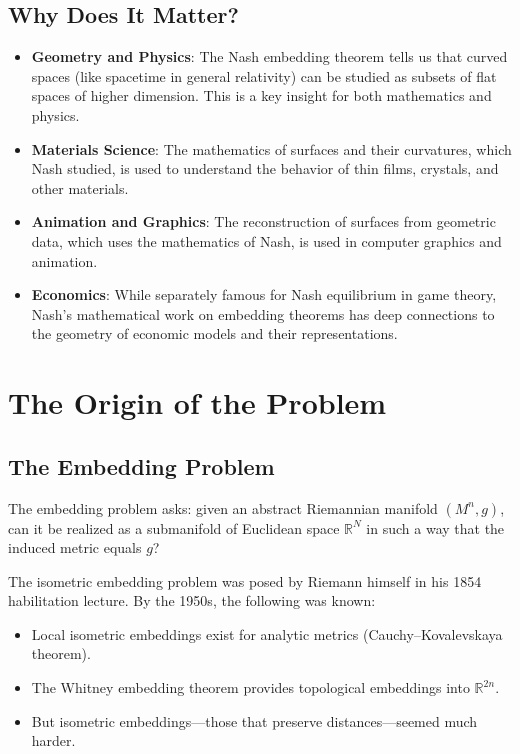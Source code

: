 \subsection{Why Does It Matter?}

\begin{itemize}
\item \textbf{Geometry and Physics}: The Nash embedding theorem tells us that curved spaces (like spacetime in general relativity) can be studied as subsets of flat spaces of higher dimension. This is a key insight for both mathematics and physics.

\item \textbf{Materials Science}: The mathematics of surfaces and their curvatures, which Nash studied, is used to understand the behavior of thin films, crystals, and other materials.

\item \textbf{Animation and Graphics}: The reconstruction of surfaces from geometric data, which uses the mathematics of Nash, is used in computer graphics and animation.

\item \textbf{Economics}: While separately famous for Nash equilibrium in game theory, Nash's mathematical work on embedding theorems has deep connections to the geometry of economic models and their representations.
\end{itemize}

\section{The Origin of the Problem}

\subsection{The Embedding Problem}

The embedding problem asks: given an abstract Riemannian manifold $(M^n, g)$, can it be realized as a submanifold of Euclidean space $\mathbb{R}^N$ in such a way that the induced metric equals $g$?

The isometric embedding problem was posed by Riemann himself in his 1854 habilitation lecture. By the 1950s, the following was known:
\begin{itemize}
\item Local isometric embeddings exist for analytic metrics (Cauchy--Kovalevskaya theorem).
\item The Whitney embedding theorem provides topological embeddings into $\mathbb{R}^{2n}$.
\item But isometric embeddings---those that preserve distances---seemed much harder.
\end{itemize}

